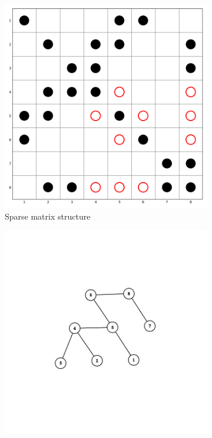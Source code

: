 \begin{figure}[H]
    \centering
    \begin{subfigure}[b]{0.45\textwidth}
        \centering
        \includegraphics[width=\textwidth]{fig/background/etree-1.png}
        \caption{Sparse matrix structure}
        \label{fig:etree-matrix}
    \end{subfigure}
    \hfill
    \begin{subfigure}[b]{0.45\textwidth}
        \centering
        \vspace{0.5cm}
        \includegraphics[width=1\textwidth]{fig/background/etree-2.png}

\end{subfigure}
\end{figure}

